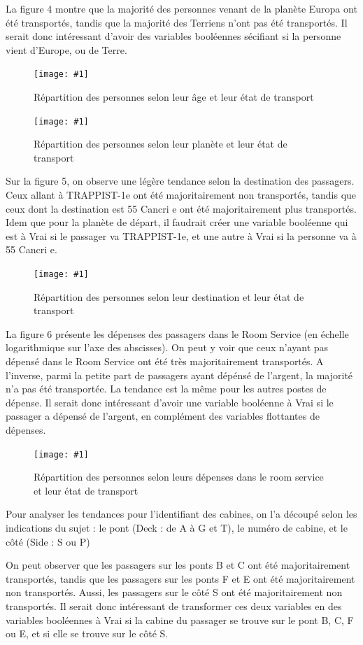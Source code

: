 \documentclass[a4paper]{article}
\newcommand{\illustration}[3]{
    \begin{figure}[h!]
        \centering
        \texttt{[image: \#1]}
        \caption{#2}
    \end{figure}
}
\begin{document}
    
    La figure 4 montre que la majorité des personnes venant de la planète Europa ont été transportés,
    tandis que la majorité des Terriens n'ont pas été transportés. Il serait donc intéressant d'avoir des
    variables booléennes sécifiant si la personne vient d'Europe, ou de Terre.
    
    \illustration{images/Figure 3.png}{Répartition des personnes selon leur âge et leur état de transport}{6cm}
    
    \illustration{images/Figure 4.png}{Répartition des personnes selon leur planète et leur état de transport}{6cm}
    
    Sur la figure 5, on observe une légère tendance selon la destination des passagers.
    Ceux allant à TRAPPIST-1e ont été majoritairement non transportés, tandis que ceux dont la destination est 55 Cancri e
    ont été majoritairement plus transportés. Idem que pour la planète de départ, il faudrait créer une variable booléenne
    qui est à Vrai si le passager va TRAPPIST-1e, et une autre à Vrai si la personne va à 55 Cancri e.

    \illustration{images/Figure 5.png}{Répartition des personnes selon leur destination et leur état de transport}{6cm}
    
    La figure 6 présente les dépenses des passagers dans le Room Service (en échelle logarithmique sur l'axe des abscisses).
    On peut y voir que ceux n'ayant pas dépensé dans le Room Service ont été très majoritairement transportés.
    A l'inverse, parmi la petite part de passagers ayant dépénsé de l'argent, la majorité n'a pas été transportée.
    La tendance est la même pour les autres postes de dépense.
    Il serait donc intéressant d'avoir une variable booléenne à Vrai si le passager a dépensé de l'argent,
    en complément des variables flottantes de dépenses.

    \illustration{images/Figure 6.png}{Répartition des personnes selon leurs dépenses dans le room service et leur état de transport}{6cm}

    Pour analyser les tendances pour l'identifiant des cabines, on l'a découpé selon les indications du sujet :
    le pont (Deck : de A à G et T), le numéro de cabine, et le côté (Side : S ou P)

    On peut observer que les passagers sur les ponts B et C ont été majoritairement transportés,
    tandis que les passagers sur les ponts F et E ont été majoritairement non transportés.
    Aussi, les passagers sur le côté S ont été majoritairement non transportés.
    Il serait donc intéressant de transformer ces deux variables en des variables booléennes
    à Vrai si la cabine du passager se trouve sur le pont B, C, F ou E, et si elle se trouve sur le côté S.
\end{document}
